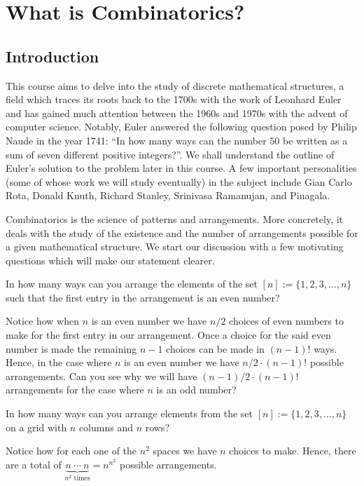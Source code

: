 \chapter{What is Combinatorics?}
\section{Introduction}
This course aims to delve into the study of discrete mathematical structures, a field which traces its roots back to the 1700s with the work of Leonhard Euler and has gained much attention between the 1960s and 1970s with the advent of computer science. Notably, Euler answered the following question posed by Philip Naude in the year 1741: “In how many ways can the number $50$ be written as a sum of seven different positive integers?”. We shall understand the outline of Euler’s solution to the problem later in this course. A few important personalities (some of whose work we will study eventually) in the subject include Gian Carlo Rota, Donald Knuth, Richard Stanley, Srinivasa Ramanujan, and Pinagala. 

Combinatorics is the science of patterns and arrangements. More concretely, it deals with the study of the existence and the number of arrangements possible for a given mathematical structure. We start our discussion with a few motivating questions which will make our statement clearer.

\begin{question}
	In how many ways can you arrange the elements of the set $[n]:=\{1,2,3,\ldots,n\}$ such that the first entry in the arrangement is an even number?
	\label{q:1.1}
\end{question}

Notice how when $n$ is an even number we have $n/2$ choices of even numbers to make for the first entry in our arrangement. Once a choice for the said even number is made the remaining $n-1$ choices can be made in $\left( n-1 \right)!$ ways. Hence, in the case where $n$ is an even number we have $n/2 \cdot \left(n-1 \right)!$ possible arrangements. Can you see why we will have $\left( n-1 \right)/2 \cdot \left( n-1 \right)!$ arrangements for the case where $n$ is an odd number?

\begin{question}
    In how many ways can you arrange elements from the set $[n]:=\{1,2,3,\ldots,n\}$ on a grid with $n$ columns and $n$ rows?
\end{question}

Notice how for each one of the $n^2$ spaces we have $n$ choices to make. Hence, there are a total of $\underbrace{n \ \cdots \ n}_{n^2 \text{ times}} = n^{n^2}$ possible arrangements.

